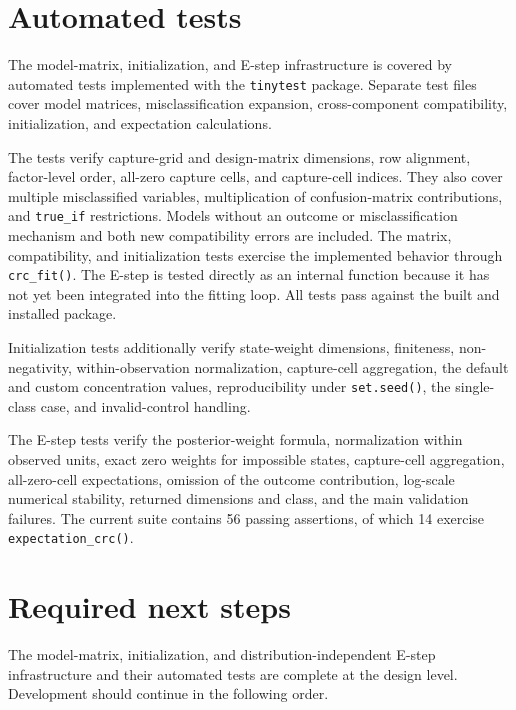 \documentclass[11pt,letterpaper]{article}
\begin{document}
\section{Automated tests}

The model-matrix, initialization, and E-step infrastructure is covered by
automated tests implemented with the \texttt{tinytest} package. Separate test
files cover model matrices, misclassification expansion, cross-component
compatibility, initialization, and expectation calculations.

The tests verify capture-grid and design-matrix dimensions, row alignment,
factor-level order, all-zero capture cells, and capture-cell indices. They also
cover multiple misclassified variables, multiplication of confusion-matrix
contributions, and \texttt{true\_if} restrictions. Models without an outcome
or misclassification mechanism and both new compatibility errors are included.
The matrix, compatibility, and initialization tests exercise the implemented
behavior through \texttt{crc\_fit()}. The E-step is tested directly as an
internal function because it has not yet been integrated into the fitting
loop. All tests pass against the built and installed package.

Initialization tests additionally verify state-weight dimensions, finiteness,
non-negativity, within-observation normalization, capture-cell aggregation,
the default and custom concentration values, reproducibility under
\texttt{set.seed()}, the single-class case, and invalid-control handling.

The E-step tests verify the posterior-weight formula, normalization within
observed units, exact zero weights for impossible states, capture-cell
aggregation, all-zero-cell expectations, omission of the outcome contribution,
log-scale numerical stability, returned dimensions and class, and the main
validation failures. The current suite contains 56 passing assertions, of
which 14 exercise \texttt{expectation\_crc()}.

\section{Required next steps}

The model-matrix, initialization, and distribution-independent E-step
infrastructure and their automated tests are complete at the design level.
Development should continue in the following order.
\end{document}

